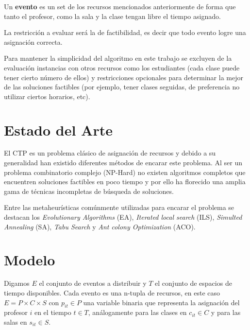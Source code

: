 \documentclass[letter, 10pt]{article}
\renewcommand{\bf}[1]{\textbf{#1}}
\begin{document}
Un \bf{evento} es un set de los recursos mencionados anteriormente de
forma que tanto el profesor, como la sala y la clase tengan libre el tiempo
asignado.

La restricción a evaluar será la de factibilidad, es decir que todo evento logre
una asignación correcta.

Para mantener la simplicidad del algoritmo en este trabajo se excluyen de la
evaluación instancias con otros recursos como los estudiantes (cada clase puede
tener cierto número de ellos) y restricciones opcionales para determinar la
mejor de las soluciones factibles (por ejemplo, tener clases seguidas, de
preferencia no utilizar ciertos horarios, etc).

\section{Estado del Arte}\label{sec:art}
El CTP es un problema clásico de asignación de recursos y debido a su
generalidad han existido diferentes métodos de encarar este problema.
Al ser un problema combinatorio complejo (NP-Hard) no existen algoritmos
completos que encuentren soluciones factibles en poco tiempo y por ello ha
florecido una amplia gama de técnicas incompletas de búsqueda de soluciones.

Entre las metaheurísticas comúnmente utilizadas para encarar el problema se
destacan los \emph{Evolutionary Algorithms} (EA), \emph{Iterated local search}
(ILS), \emph{Simulted Annealing} (SA), \emph{Tabu Search} y \emph{Ant colony
Optimization} (ACO).

\section{Modelo}\label{sec:mod}
Digamos $E$ el conjunto de eventos a distribuir y $T$ el conjunto de espacios de
tiempo disponibles. Cada evento es una n-tupla de recursos, en este caso $E = P
\times C \times S$ con $p_{it} \in P$ una variable binaria que representa la
asignación del profesor $i$ en el tiempo $t \in T$, análogamente para las clases
en $c_{it} \in C$ y para las salas en $s_{it} \in S$.
\end{document}
